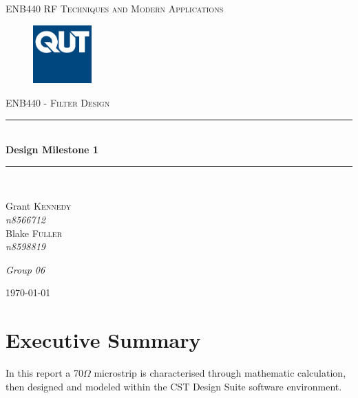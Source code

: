 \documentclass{paper}
\newcommand{\HRule}{\rule{\linewidth}{0.5mm}}
\begin{document}
\newpage
\begin{titlepage}
\begin{center}

\textsc{\LARGE ENB440 RF Techniques and Modern Applications}\\[0.75cm]

\begin{figure}[H]
\centering
\includegraphics[width=0.2\textwidth]{IMG/QUT} \\[0.75cm]
\end{figure}

\textsc{\Large ENB440 - Filter Design}\\[0.5cm]

\HRule \\[0.4cm]
{ \huge \bfseries Design Milestone 1 \\[0.4cm] }

\HRule \\[1.5cm]



\begin{minipage}{0.4\textwidth}
\begin{flushleft} \large
Grant \textsc{Kennedy} \\
\emph{n8566712}\\
Blake \textsc{Fuller} \\
\emph{n8598819}\\
\end{flushleft}
\end{minipage}
\begin{minipage}{0.4\textwidth}
\begin{flushright} \large


\emph{Group 06}\\
\end{flushright}
\end{minipage}

\vfill

{\large \today}
\end{center}
\end{titlepage}

\section*{Executive Summary}
In this report a 70$\Omega$ microstrip is characterised through mathematic calculation, then designed and modeled within the CST Design Suite software environment.\\
\end{document}
